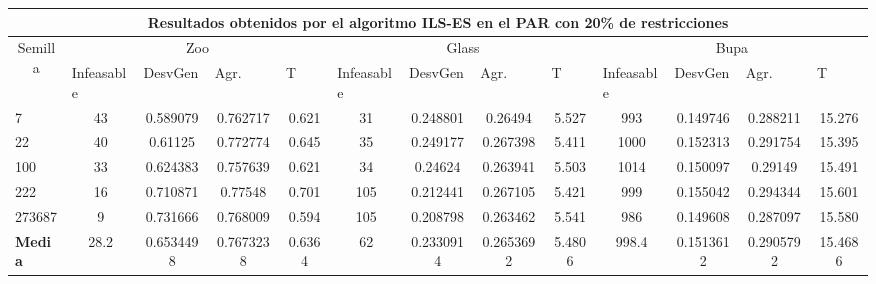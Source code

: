 \begin{table}[H]
	\tiny

	\begin{adjustwidth}{-1cm}{-1cm}%
	
	\begin{tabular}{|l|c|c|c|c|c|c|c|c|c|c|c|c|}
	\hline
	\multicolumn{13}{|c|}{\textbf{Resultados obtenidos por el algoritmo ILS-ES en el PAR con 20\% de restricciones}}                                                                                                                                                                                                                                                                                                                                            \\ \hline
	\multicolumn{1}{|c|}{\multirow{2}{*}{Semilla}} & \multicolumn{4}{c|}{Zoo}                                                                                          & \multicolumn{4}{c|}{Glass}                                                                                         & \multicolumn{4}{c|}{Bupa}                                                                                          \\ \cline{2-13} 
	\multicolumn{1}{|c|}{}                                  & \multicolumn{1}{l|}{Infeasable} & \multicolumn{1}{l|}{DesvGen} & \multicolumn{1}{l|}{Agr.} & \multicolumn{1}{l|}{T} & \multicolumn{1}{l|}{Infeasable} & \multicolumn{1}{l|}{DesvGen} & \multicolumn{1}{l|}{Agr.} & \multicolumn{1}{l|}{T} & \multicolumn{1}{l|}{Infeasable} & \multicolumn{1}{l|}{DesvGen} & \multicolumn{1}{l|}{Agr.} & \multicolumn{1}{l|}{T} \\ \hline
	7   	& 43 & 0.589079 & 0.762717 & 0.621 &				31 & 0.248801 & 0.26494 & 5.527 &			 	993 & 0.149746 & 0.288211 & 15.276		\\ \hline
	22 		& 40 & 0.61125 & 0.772774 & 0.645 &				35 & 0.249177 & 0.267398 & 5.411 &		 	1000 & 0.152313 & 0.291754 & 15.395		\\ \hline
	100 	& 33 & 0.624383 & 0.757639 & 0.621 &				34 & 0.24624 & 0.263941 & 5.503 &				1014 & 0.150097 & 0.29149 & 15.491		\\ \hline
	222 	& 16 & 0.710871 & 0.77548 & 0.701 &				105 & 0.212441 & 0.267105 & 5.421 & 			999 & 0.155042 & 0.294344 & 15.601		\\ \hline
	273687 	& 9 & 0.731666 & 0.768009 & 0.594 &				105 & 0.208798 & 0.263462 & 5.541 &			986 & 0.149608 & 0.287097 & 15.580		\\ \hline
	\textbf{Media} &  28.2&	0.6534498	&0.7673238	&0.6364&	62	&0.2330914	&0.2653692	&5.4806&	998.4	&0.1513612	&0.2905792	&15.4686 \\ \hline
	\end{tabular}
	
	\end{adjustwidth}
	
\end{table}

